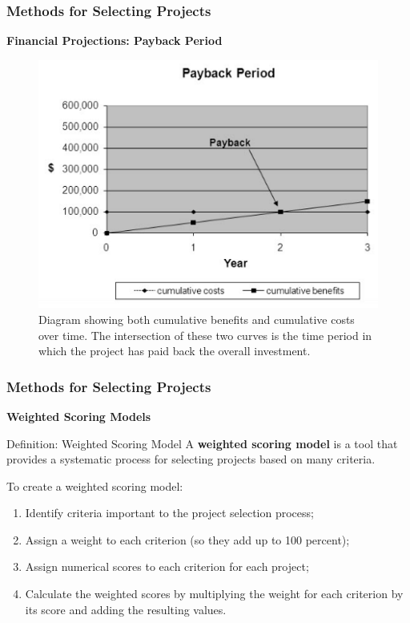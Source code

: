 \documentclass[aspectratio=169]{beamer}
\begin{document}
\begin{frame}
\frametitle{Methods for Selecting Projects}
\textbf{Financial Projections: Payback Period}\\
\begin{figure}
\includegraphics[scale=0.5]{payback}
\vspace{-0.4cm}
\caption{Diagram showing both cumulative benefits and cumulative costs over time. The intersection of these two curves is the time period in which the project has paid back the overall investment.}
\end{figure}
\end{frame}
\begin{frame}
\frametitle{Methods for Selecting Projects}
\textbf{Weighted Scoring Models}\\
\vspace{0.5cm}
\begin{block}{Definition: Weighted Scoring Model}
A \textbf{weighted scoring model} is a tool that provides a systematic process for selecting projects based on many criteria.
\end{block}
\vspace{0.5cm}
To create a weighted scoring model:
\begin{enumerate}
\item Identify criteria important to the project selection process;
\item Assign a weight to each criterion (so they add up to 100 percent);
\item Assign numerical scores to each criterion for each project;
\item Calculate the weighted scores by multiplying the weight for each criterion by its score and adding the resulting values.
\end{enumerate}
\end{frame}
\end{document}

